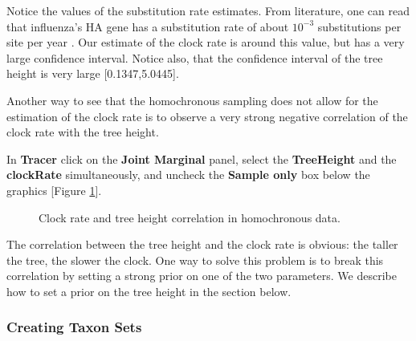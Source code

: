 \documentclass[11pt]{article}
\begin{document}
Notice the values of the substitution rate estimates. From literature, one can read that influenza's HA gene has a substitution rate of about $10^{-3}$ substitutions per site per year \citep{jenkins2002}. Our estimate of the clock rate is around this value, but has a very large confidence interval. Notice also, that the confidence interval of the tree height is very large [0.1347,5.0445].

Another way to see that the homochronous sampling does not allow for the estimation of the clock rate is to observe a very strong negative correlation of the clock rate with the tree height.

\begin{framed}
In \textbf{Tracer} click on the \textbf{Joint Marginal} panel, select the \textbf{TreeHeight} and the \textbf{clockRate} simultaneously, and uncheck the \textbf{Sample only} box below the graphics [Figure \ref{clockRatetreeHeightCorrelation}].
\end{framed}

\begin{figure}[h!]
\centering
{}
\caption{\small Clock rate and tree height correlation in homochronous data.}
\label{clockRatetreeHeightCorrelation}
\end{figure}

The correlation between the tree height and the clock rate is obvious: the taller the tree, the slower the clock. One way to solve this problem is to break this correlation by setting a strong prior on one of the two parameters. We describe how to set a prior on the tree height in the section below. 



\newpage
\subsubsection{Creating Taxon Sets}
\end{document}
